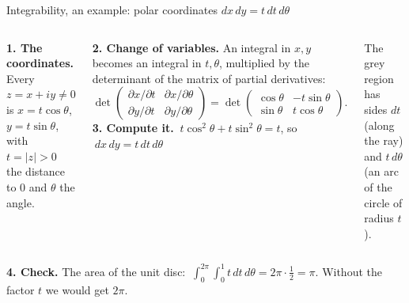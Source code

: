 \begin{frame}{Integrability, an example: polar coordinates \(dx\,dy=t\,dt\,d\theta\)}
\label{fr:polar-coordinates-dx-dy-38}
\begin{columns}[T]
\textbf{1. The coordinates.} Every \(z=x+iy\ne0\) is
\(x=t\cos\theta\), \(y=t\sin\theta\),
with \(t=|z|>0\) the distance to \(0\) and \(\theta\) the angle.
\par
\textbf{2. Change of variables.} An integral in \(x,y\) becomes an integral in \(t,\theta\), multiplied by the determinant of the matrix of partial derivatives:
\[
\det\begin{pmatrix}
\partial x/\partial t&\partial x/\partial\theta\\
\partial y/\partial t&\partial y/\partial\theta
\end{pmatrix}
=\det\begin{pmatrix}
\cos\theta&-t\sin\theta\\
\sin\theta&t\cos\theta
\end{pmatrix}.
\]
\textbf{3. Compute it.}
\(\ t\cos^2\theta+t\sin^2\theta=t\), so \(\ \boxed{dx\,dy=t\,dt\,d\theta}\)
\centering
{}
\par\smallskip
{\small The grey region has sides \(dt\) (along the ray) and \(t\,d\theta\) (an arc of the circle of radius \(t\)).}
\end{columns}
\par\smallskip
\textbf{4. Check.} The area of the unit disc:
\(\ \int_0^{2\pi}\!\int_0^1t\,dt\,d\theta=2\pi\cdot\tfrac12=\pi\). Without the factor \(t\) we would get \(2\pi\).
\end{frame}

